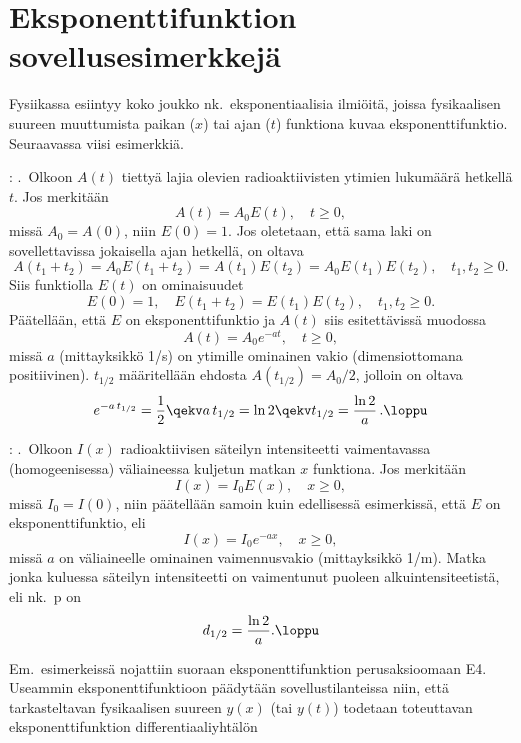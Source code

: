 \section{Eksponenttifunktion sovellusesimerkkejä}
\label{eksponenttifunktio fysiikassa}
\alku
{}

Fysiikassa esiintyy koko joukko nk.\ eksponentiaalisia ilmiöitä, joissa fysikaalisen suureen 
muuttumista paikan ($x$) tai ajan ($t$) funktiona kuvaa eksponenttifunktio. Seuraavassa viisi
esimerkkiä.
%
\begin{Exa}: \label{radioaktiivisuus} .\ Olkoon $A(t)$ tiettyä
lajia olevien radioaktiivisten ytimien lukumäärä hetkellä $t$. Jos merkitään
\[
A(t)=A_0 E(t),\quad t\geq 0,
\]
missä $A_0=A(0)$, niin $E(0)=1$. Jos oletetaan, että sama laki on sovellettavissa jokaisella 
ajan hetkellä, on oltava
\[
A(t_1+t_2) = A_0 E(t_1+t_2) = A(t_1)E(t_2) = A_0 E(t_1)E(t_2), \quad t_1,t_2 \ge 0.
\]
Siis funktiolla $E(t)$ on ominaisuudet
\[
E(0)=1, \quad E(t_1+t_2)=E(t_1)E(t_2), \quad t_1,t_2 \ge 0.
\]
Päätellään, että $E$ on eksponenttifunktio ja $A(t)$ siis esitettävissä muodossa
\[ A(t) = A_0 e^{-at}, \quad t \ge 0, \]
missä $a$ (mittayksikkö 1/s) on ytimille ominainen vakio (dimensiottomana positiivinen). 
 $t_{1/2}$ määritellään ehdosta $A(t_{1/2}) = A_0/2$, jolloin on oltava
\[ 
e^{-a\,t_{1/2}} = \dfrac{1}{2} \qekv a\,t_{1/2} 
                = \ln 2 \qekv t_{1/2} = \dfrac{\ln 2}{a}\,. \loppu 
\]
\end{Exa} 
\begin{Exa}: \label{säteilyvaimennus} .\ Olkoon $I(x)$
radioaktiivisen säteilyn intensiteetti vaimentavassa (homogeenisessa) väliaineessa kuljetun
matkan $x$ funktiona. Jos merkitään
\[
I(x)=I_0E(x),\quad x \ge 0,
\]
missä $I_0=I(0)$, niin päätellään samoin kuin edellisessä esimerkissä, että $E$ on 
eksponenttifunktio, eli
\[ 
I(x) = I_0 e^{-ax}, \quad x \ge 0,
\]
missä $a$ on väliaineelle ominainen vaimennusvakio (mittayksikkö 1/m). Matka jonka kuluessa 
säteilyn intensiteetti on vaimentunut puoleen alkuintensiteetistä, eli nk.\ 
p on
\[ 
d_{1/2} = \dfrac{\ln 2}{a}. \loppu 
\]
\end{Exa}
Em.\ esimerkeissä nojattiin suoraan eksponenttifunktion perusaksioomaan E4. Useammin
eksponenttifunktioon päädytään sovellustilanteissa niin, että tarkasteltavan fysikaalisen
suureen $y(x)$ (tai $y(t)$) todetaan toteuttavan eksponenttifunktion differentiaaliyhtälön
